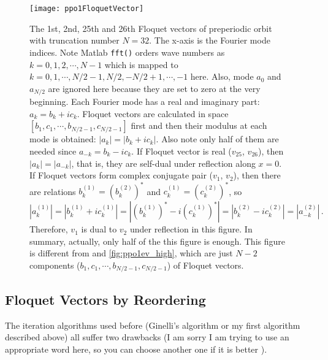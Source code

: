 \begin{figure}[h]
  \centering
  \texttt{[image: ppo1FloquetVector]}
  \caption{The 1st, 2nd, 25th and 26th Floquet vectors of
    preperiodic orbit  with truncation number
    $N=32$. The x-axis is the Fourier mode
    indices. Note Matlab \texttt{fft()} orders wave numbers as
    $k=0,1,2,\cdots,N-1$ which is mapped to
    $k=0,1,\cdots,N/2-1,N/2,-N/2+1,\cdots,-1$ here. Also,
    mode $a_0$ and $a_{N/2}$ are ignored here because they are set to
    zero at the very beginning.
    Each Fourier mode
    has a real and imaginary part: $a_k=b_k+ic_k$. Floquet vectors
    are calculated in space $[b_1, c_1,\cdots,b_{N/2-1},c_{N/2-1}]$
    first and then their modulus at each mode is obtained:
    $|a_{k}|=|b_k+ic_k|$. Also note only half of them are needed since
    $a_{-k}=b_{k}-ic_{k}$. If Floquet vector is real ($v_{25}$, $v_{26}$),
    then $|a_{k}|=|a_{-k}|$, that is, they are self-dual under reflection
    along $x=0$.
    If Floquet vectors form complex conjugate pair ($v_1$, $v_2$), then
    there are relations
    $b^{(1)}_{k}=(b^{(2)}_{k})^{*}$ and $c^{(1)}_{k}=(c^{(2)}_{k})^{*}$,
    so
    $
    |a_{k}^{(1)}|=|b_k^{(1)}+ic_{k}^{(1)}|=|(b_{k}^{(1)})^{*}-i(c_{k}^{(1)})^{*}|
    =|b_k^{(2)}-ic_{k}^{(2)}|
    =|a_{-k}^{(2)}|
    \,.
    $
    Therefore, $v_1$ is dual to $v_2$ under reflection in this figure.
    In summary, actually, only half of the this figure is enough.
    This figure is different from  and
    \ref{fig:ppo1ev_high}, which are just
    $N-2$ components ($b_1, c_1,\cdots,b_{N/2-1},c_{N/2-1}$)
    of Floquet vectors.
  }
  \label{fig:ppo1FloquetVector}
\end{figure}

\clearpage
\subsection{Floquet Vectors by Reordering}

The iteration algorithms used before (Ginelli's algorithm
 or my first algorithm described above)
 all suffer two drawbacks (I am sorry I am trying to use
an appropriate word here, so you can choose another
 one if it is better ).

